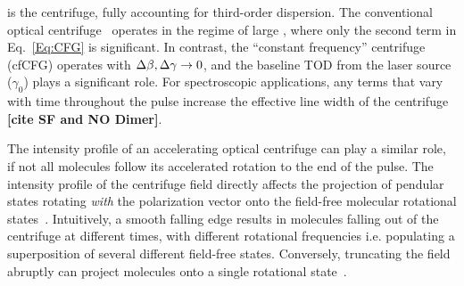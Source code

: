 \noindent is the centrifuge, fully accounting for third-order dispersion. The conventional optical centrifuge~\cite{Optical-Centrifuge-for-Molecules1999} operates in the regime of large \db{}, where only the second term in Eq.~\ref{Eq:CFG} is significant. In contrast, the ``constant frequency'' centrifuge~\cite{Optical-centrifuge-with2025} (cfCFG) operates with $\Delta\beta, \Delta\gamma \rightarrow 0$, and the baseline TOD from the laser source ($\gamma_0$) plays a significant role. For spectroscopic applications, any terms that vary with time throughout the pulse increase the effective line width of the centrifuge \textbf{[cite SF and NO Dimer]}. 

The intensity profile of an accelerating optical centrifuge  can play a similar role, if not all molecules follow its accelerated rotation to the end of the pulse. The intensity profile of the centrifuge field directly affects the projection of pendular states rotating \textit{with} the polarization vector onto the field-free molecular rotational states~\cite{Observation-of-nondispersing-classical-like2015}. Intuitively, a smooth falling edge results in molecules falling out of the centrifuge at different times, with different rotational frequencies i.e. populating a superposition of several different field-free states. Conversely, truncating the field abruptly can project molecules onto a single rotational state~\cite{Observation-of-nondispersing-classical-like2015}. 

